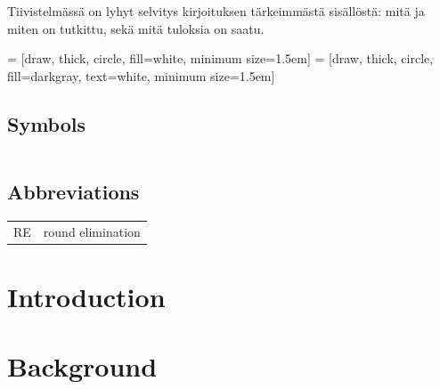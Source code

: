 \documentclass[english, 12pt, a4paper, sci, a-1b, online]{aaltothesis}
\date{2021}
\begin{document}
\makecoverpage{}

\makecopyrightpage{}

\begin{abstractpage}[english]
  \abstracttext{}
\end{abstractpage}

\newpage


\begin{abstractpage}[finnish]
  Tiivistelmässä on lyhyt selvitys
  kirjoituksen tärkeimmästä sisällöstä: mitä ja miten on tutkittu,
  sekä mitä tuloksia on saatu. 
\end{abstractpage}

\thesistableofcontents{}



\newtheorem{theorem}{Theorem}[section]
\newtheorem{lemma}{Lemma}[section]
\newtheorem{corollary}{Corollary}[theorem]

\newcommand{\reline}[1]{\textbf{#1}}

 = [draw, thick, circle, fill=white, minimum size=1.5em]
 = [draw, thick, circle, fill=darkgray, text=white, minimum size=1.5em]

\subsection*{Symbols}

\begin{tabular}{ll}
\end{tabular}

\subsection*{Abbreviations}

\begin{tabular}{ll}
RE         & round elimination
\end{tabular}

\cleardoublepage{}
\section{Introduction}

\thispagestyle{empty}

\clearpage
\section{Background}
\end{document}
